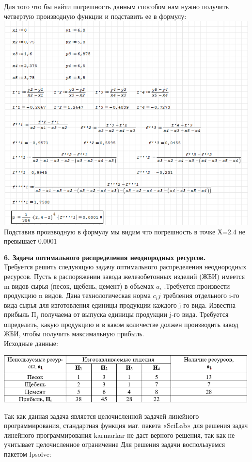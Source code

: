 \documentclass[russian,utf8,nocolumxxxi,nocolumnxxxii]{eskdtext}
\begin{document}
Для того что бы найти погрешность данным способом нам нужно получить четвертую производную функции и подставить ее в формулу:
\\\includegraphics[scale=0.9]{2.PNG}
\\Подставив производную в формулу мы видим что погрешность в точке Х=2.4 не превышает 0.0001
\newpage 
\par 
\normalsize 
{\bf6. Задача оптимального распределения неоднородных ресурсов.}\\ 
Требуется решить следующую задачу оптимального распределения неоднородных ресурсов. Пусть в распоряжении завода железобетонных изделий (ЖБИ) имеется m видов сырья (песок, щебень, цемент) в объемах $ a_i$ .Требуется произвести продукцию n видов. Дана технологическая норма $c_ij$ требления отдельного i-го вида сырья для изготовления единицы продукции каждого j-го вида. Известна прибыль $П_j$ получаема от выпуска единицы продукции j-го вида. Требуется определить, какую продукцию и в каком количестве должен производить завод ЖБИ, чтобы получить максимальную прибыль.\\ 
Исходные данные:\\ 

\begin{center} 
\includegraphics[scale=1]{1} 
\end{center} 
Так как данная задача является целочисленной задачей линейного программирования, стандартная функция мат. пакета «SciLab» для решения задач линейного программирования karmarkar не даст верного решения, так как не учитывает целочисленное ограничение 
Для решения задачи воспользуемся пакетом lpsolve: 
\end{document}
